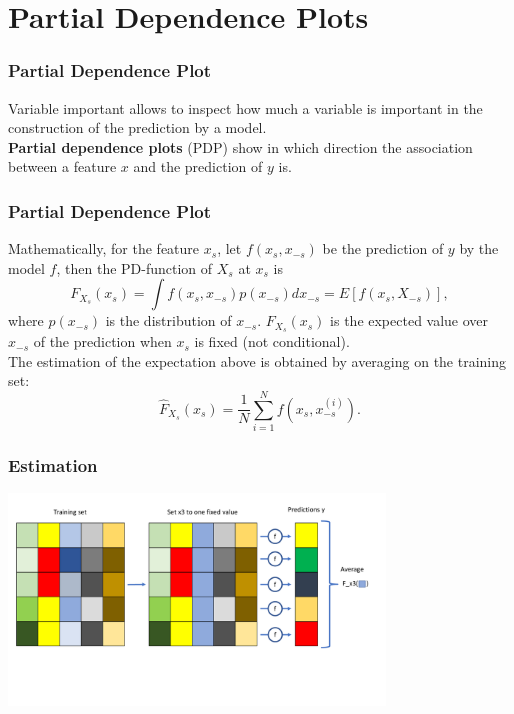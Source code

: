 \section{Partial Dependence Plots}
\begin{frame}
\frametitle{Partial Dependence Plot}
Variable important allows to inspect how much a variable is important in the construction of the prediction by a model.\\ 
\vspace{0.2cm}
{\bf Partial dependence plots} (PDP) show in which direction the association between a feature $x$ and the prediction of $y$ is. 
\end{frame}
\begin{frame}
\frametitle{Partial Dependence Plot}
Mathematically, for the feature $x_s$, let $f(x_s, x_{-s})$ be the prediction of $y$ by the model $f$, then the PD-function of $X_s$ at $x_s$ is
$$
F_{X_s}(x_s) = \int f(x_s, x_{-s}) p(x_{-s}) dx_{-s} = E[f(x_s, X_{-s})],
$$
where $p(x_{-s})$ is the distribution of $x_{-s}$. $F_{X_s}(x_s)$ is the expected value over $x_{-s}$ of the prediction when $x_s$ is fixed (not conditional). \\
\vspace{0.3cm}
The estimation of the expectation above is obtained by averaging on the training set:
$$
\hat{F}_{X_s}(x_s) = \frac{1}{N}\sum_{i=1}^N f(x_s, x_{-s}^{(i)}).
$$
\end{frame}
\begin{frame}
\frametitle{Estimation}
\begin{center}
\includegraphics[width=10cm]{../Graphs/PDP_Illustr.pdf}
\end{center}
\end{frame}
